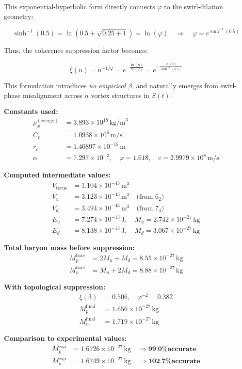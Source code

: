 This exponential-hyperbolic form directly connects $\varphi$ to the swirl-dilation geometry:

\[
\sinh^{-1}(0.5) = \ln\left( 0.5 + \sqrt{0.25 + 1} \right) = \ln(\varphi)
\quad \Rightarrow \quad
\varphi = e^{\sinh^{-1}(0.5)}
\]

Thus, the coherence suppression factor becomes:

\[
\boxed{
\xi(n) = n^{-1/\varphi} = e^{-\frac{\ln(n)}{\ln(\varphi)}} = e^{-\frac{\ln(n)}{\sinh^{-1}(0.5)}}
}
\]

This formulation introduces \emph{no empirical $\beta$}, and naturally emerges from swirl-phase misalignment across $n$ vortex structures in $S(t)$.

\textbf{Constants used:}
\begin{align*}
\rho_\text{\ae}^{(\text{energy})} &= 3.893 \times 10^{18} \, \text{kg/m}^3 \\
C_e &= 1.0938 \times 10^6 \, \text{m/s} \\
r_c &= 1.40897 \times 10^{-15} \, \text{m} \\
\alpha &= 7.297 \times 10^{-3}, \quad \varphi = 1.618, \quad c = 2.9979 \times 10^8 \, \text{m/s}
\end{align*}

\textbf{Computed intermediate values:}
\begin{align*}
V_{\text{torus}} &= 1.104 \times 10^{-43} \, \text{m}^3 \\
V_u &= 3.123 \times 10^{-43} \, \text{m}^3 \quad \text{(from } 6_2 \text{)} \\
V_d &= 3.494 \times 10^{-43} \, \text{m}^3 \quad \text{(from } 7_4 \text{)} \\
E_u &= 7.274 \times 10^{-13} \, \text{J}, \quad M_u = 2.742 \times 10^{-27} \, \text{kg} \\
E_d &= 8.138 \times 10^{-13} \, \text{J}, \quad M_d = 3.067 \times 10^{-27} \, \text{kg}
\end{align*}

\textbf{Total baryon mass before suppression:}
\begin{align*}
M_p^{\text{bare}} &= 2M_u + M_d = 8.55 \times 10^{-27} \, \text{kg} \\
M_n^{\text{bare}} &= M_u + 2M_d = 8.88 \times 10^{-27} \, \text{kg}
\end{align*}

\textbf{With topological suppression:}
\begin{align*}
\xi(3) &= 0.506, \quad \varphi^{-2} = 0.382 \\
M_p^{\text{final}} &= 1.656 \times 10^{-27} \, \text{kg} \\
M_n^{\text{final}} &= 1.719 \times 10^{-27} \, \text{kg}
\end{align*}

\textbf{Comparison to experimental values:}
\begin{align*}
M_p^{\text{exp}} &= 1.6726 \times 10^{-27} \, \text{kg} \quad \Rightarrow \textbf{99.0\% accurate} \\
M_n^{\text{exp}} &= 1.6749 \times 10^{-27} \, \text{kg} \quad \Rightarrow \textbf{102.7\% accurate}
\end{align*}

